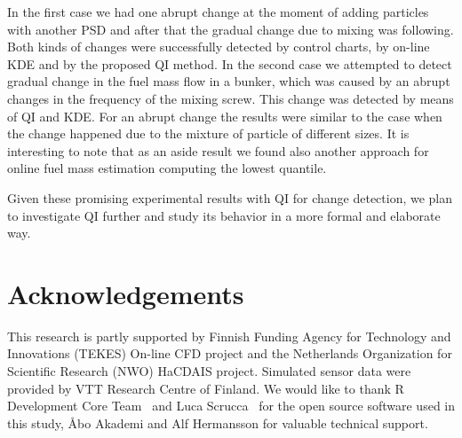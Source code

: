 In the first case we had one abrupt change at the moment of adding particles with another PSD and after that the gradual
change due to mixing was following. Both kinds of changes were successfully detected by control charts, by on-line KDE and by the proposed QI method.
In the second case we attempted to detect gradual change in the fuel mass flow in a bunker, which was caused by an abrupt changes in the frequency of the mixing screw. This change was detected by means of QI and KDE.
For an abrupt change the results were similar to the case when the change happened due to the mixture of particle of different sizes.
It is interesting to note that as an aside result we found also another approach for online fuel mass estimation computing the lowest quantile.

Given these promising experimental results with QI for change detection, we plan to investigate QI further and study its behavior in a more formal and elaborate way.

\section{Acknowledgements}
This research is partly supported by Finnish Funding Agency for Technology and Innovations (TEKES) On-line CFD project and the Netherlands Organization for Scientific Research (NWO) HaCDAIS project.
Simulated sensor data were provided by VTT Research Centre of Finland.
We would like to thank R Development Core Team~\cite{Rref} and Luca Scrucca~\cite{qcc} for the open source software used in this study, \r{A}bo Akademi and Alf Hermansson for valuable technical support.

